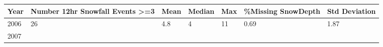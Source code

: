 \documentclass[11pt]{article}
\begin{document}
\begin{longtable}[]{@{}lllllll@{}}
\toprule
\begin{minipage}[b]{0.06\columnwidth}\raggedright\strut
Year\strut
\end{minipage} & \begin{minipage}[b]{0.26\columnwidth}\raggedright\strut
Number 12hr Snowfall Events \textgreater{}=3\strut
\end{minipage} & \begin{minipage}[b]{0.06\columnwidth}\raggedright\strut
Mean\strut
\end{minipage} & \begin{minipage}[b]{0.08\columnwidth}\raggedright\strut
Median\strut
\end{minipage} & \begin{minipage}[b]{0.06\columnwidth}\raggedright\strut
Max\strut
\end{minipage} & \begin{minipage}[b]{0.16\columnwidth}\raggedright\strut
\%Missing SnowDepth\strut
\end{minipage} & \begin{minipage}[b]{0.13\columnwidth}\raggedright\strut
Std Deviation\strut
\end{minipage}\tabularnewline
\midrule
\endhead
\begin{minipage}[t]{0.06\columnwidth}\raggedright\strut
2006\strut
\end{minipage} & \begin{minipage}[t]{0.26\columnwidth}\raggedright\strut
26\strut
\end{minipage} & \begin{minipage}[t]{0.06\columnwidth}\raggedright\strut
4.8\strut
\end{minipage} & \begin{minipage}[t]{0.08\columnwidth}\raggedright\strut
4\strut
\end{minipage} & \begin{minipage}[t]{0.06\columnwidth}\raggedright\strut
11\strut
\end{minipage} & \begin{minipage}[t]{0.16\columnwidth}\raggedright\strut
0.69\strut
\end{minipage} & \begin{minipage}[t]{0.13\columnwidth}\raggedright\strut
1.87\strut
\end{minipage}\tabularnewline
\begin{minipage}[t]{0.06\columnwidth}\raggedright\strut
2007\strut
\end{minipage} & \begin{minipage}[t]{0.26\columnwidth}\raggedright\strut

\end{minipage}
\end{longtable}
\end{document}
